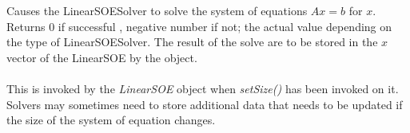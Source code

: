   \\
 \\
Causes the LinearSOESolver to solve the system of equations $Ax=b$ for $x$.
Returns $0$ if successful , negative number if not; the actual value depending on
the type of LinearSOESolver. The result of the solve are to be stored
in the $x$ vector of the LinearSOE by the object.\\

 \\
This is invoked by the {\em LinearSOE} object when {\em setSize()} has
been invoked on it. Solvers may sometimes need to store additional
data that needs to be updated if the size of the system of equation
changes. \\





